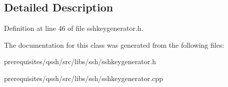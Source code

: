 \subsection{Detailed Description}


Definition at line 46 of file sshkeygenerator.\+h.



The documentation for this class was generated from the following files\+:\begin{DoxyCompactItemize}
\item 
prerequisites/qssh/src/libs/ssh/sshkeygenerator.\+h\item 
prerequisites/qssh/src/libs/ssh/sshkeygenerator.\+cpp\end{DoxyCompactItemize}
